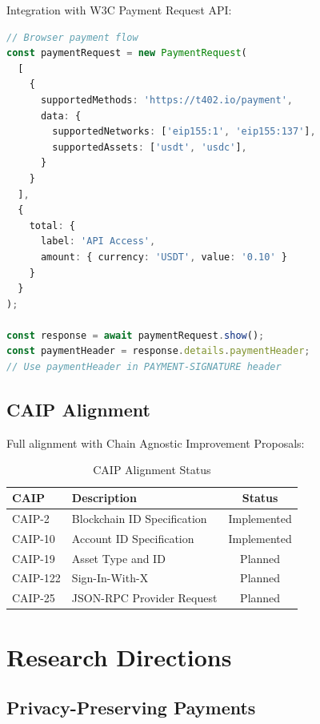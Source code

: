 Integration with W3C Payment Request API:

\begin{lstlisting}[language=typescript, caption={W3C Payment Request Integration}]
// Browser payment flow
const paymentRequest = new PaymentRequest(
  [
    {
      supportedMethods: 'https://t402.io/payment',
      data: {
        supportedNetworks: ['eip155:1', 'eip155:137'],
        supportedAssets: ['usdt', 'usdc'],
      }
    }
  ],
  {
    total: {
      label: 'API Access',
      amount: { currency: 'USDT', value: '0.10' }
    }
  }
);

const response = await paymentRequest.show();
const paymentHeader = response.details.paymentHeader;
// Use paymentHeader in PAYMENT-SIGNATURE header
\end{lstlisting}

\subsection{CAIP Alignment}

Full alignment with Chain Agnostic Improvement Proposals:

\begin{table}[htbp]
\centering
\caption{CAIP Alignment Status}
\label{tab:caip-alignment}
\begin{tabular}{@{}llc@{}}
\toprule
\textbf{CAIP} & \textbf{Description} & \textbf{Status} \\
\midrule
CAIP-2 & Blockchain ID Specification & Implemented \\
CAIP-10 & Account ID Specification & Implemented \\
CAIP-19 & Asset Type and ID & Planned \\
CAIP-122 & Sign-In-With-X & Planned \\
CAIP-25 & JSON-RPC Provider Request & Planned \\
\bottomrule
\end{tabular}
\end{table}

\section{Research Directions}
\label{sec:research-directions}

\subsection{Privacy-Preserving Payments}

